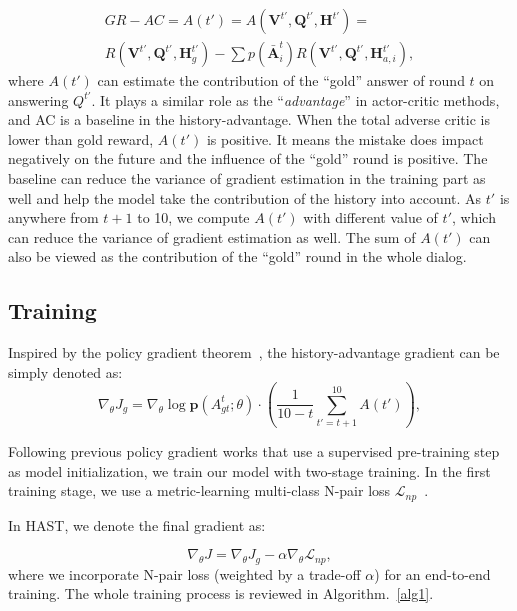 \documentclass[10pt,twocolumn,letterpaper]{article}
\begin{document}
 \begin{equation}
    \begin{split}
     GR-AC = A(t') = A(\bm{V}^{t'},\bm{Q}^{t'},\bm{H}^{t'}) = \\
     R(\bm{V}^{t'},\bm{Q}^{t'},\bm{H}^{t'}_{g})
     - \sum p(\bm{\bar{A}}^{t}_{i})R(\bm{V}^{t'},\bm{Q}^{t'},\bm{H}^{t'}_{a,i}), \label{equ:advantage}
    \end{split}
 \end{equation}
where $A(t')$ can estimate the contribution of the ``gold'' answer of round $t$ on answering $Q^{t'}$. It plays a similar role as the ``\emph{advantage}'' in actor-critic methods, and AC is a baseline in the history-advantage. When the total adverse critic is lower than gold reward, $A(t')$ is positive. It means the mistake does impact negatively on the future and the influence of the ``gold'' round is positive. The baseline can reduce the variance of gradient estimation in the training part as well and help the model take the contribution of the history into account. As $t'$ is anywhere from $t+1$ to 10, we compute $A(t')$ with different value of $t'$, which can reduce the variance of gradient estimation as well. The sum of $A(t')$ can also be viewed as the contribution of the ``gold'' round in the whole dialog. 


\subsection{Training}\label{sec:4.3}
Inspired by the policy gradient theorem~\cite{sutton2000policy}, the history-advantage gradient can be simply denoted as:
 \begin{equation}\label{equ:J3}
     \nabla_{\theta} J_{g}=\nabla_{\theta}\log \bm{p}(A^t_{gt};\theta) \cdot(\frac{1}{10-t}\sum_{t'=t+1}^{10}A(t')),
 \end{equation}

Following previous policy gradient works that use a supervised pre-training step as model initialization, we train our model with two-stage training. In the first training stage, we use a metric-learning multi-class N-pair loss $\mathcal{L}_{np}$~\cite{sohn2016improved,lu2017best}.

In HAST, we denote the final gradient as:

\begin{equation}
    \nabla_{\theta} J= \nabla_{\theta} J_{g} - \alpha \nabla_{\theta} \mathcal{L}_{np},
     \label{equ:gra}
\end{equation}
where we incorporate N-pair loss (weighted by a trade-off $\alpha$) for an end-to-end training.
The whole training process is reviewed in Algorithm.~\ref{alg1}.
\end{document}
